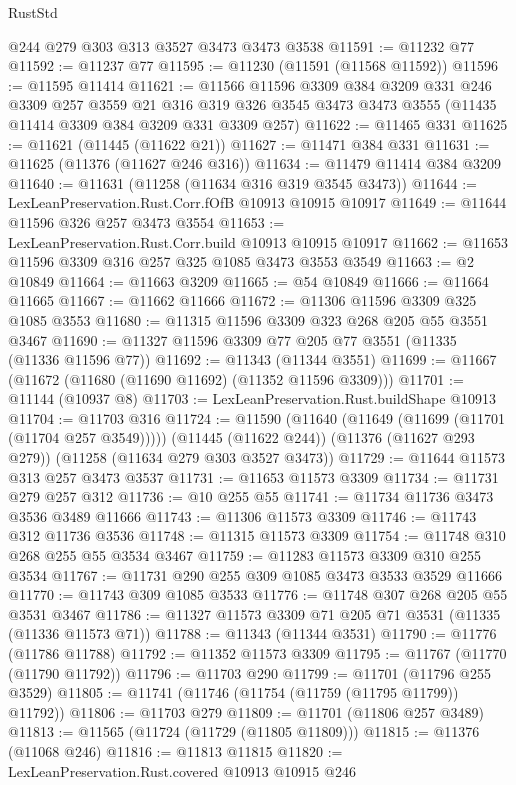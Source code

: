 \begin{lexlean}{RustStd}
\begin{coremodule}
{\begin{coremodule}
{{{{{{{{{{{{{{{{{{{{{{{{{{{{{{{{{{{{{{{{{{{{{{{{{{{{{{{{{{{{{{{{{{{{{{{{{{{{{{{{{{{{{    @244
    @279
    @303
    @313
    @3527
    @3473
    @3473
    @3538
@11591 := @11232 @77
@11592 := @11237 @77
@11595 := @11230 (@11591 (@11568 @11592))
@11596 := @11595 @11414
@11621 := @11566
    @11596
    @3309
    @384
    @3209
    @331
    @246
    @3309
    @257
    @3559
    @21
    @316
    @319
    @326
    @3545
    @3473
    @3473
    @3555
    (@11435 @11414 @3309 @384 @3209 @331 @3309 @257)
@11622 := @11465 @331
@11625 := @11621 (@11445 (@11622 @21))
@11627 := @11471 @384 @331
@11631 := @11625 (@11376 (@11627 @246 @316))
@11634 := @11479 @11414 @384 @3209
@11640 := @11631 (@11258 (@11634 @316 @319 @3545 @3473))
@11644 := LexLeanPreservation.Rust.Corr.fOfB @10913 @10915 @10917
@11649 := @11644 @11596 @326 @257 @3473 @3554
@11653 := LexLeanPreservation.Rust.Corr.build @10913 @10915 @10917
@11662 := @11653 @11596 @3309 @316 @257 @325 @1085 @3473 @3553 @3549
@11663 := @2 @10849
@11664 := @11663 @3209
@11665 := @54 @10849
@11666 := @11664 @11665
@11667 := @11662 @11666
@11672 := @11306 @11596 @3309 @325 @1085 @3553
@11680 := @11315 @11596 @3309 @323 @268 @205 @55 @3551 @3467
@11690 := @11327 @11596 @3309 @77 @205 @77 @3551 (@11335 (@11336 @11596 @77))
@11692 := @11343 (@11344 @3551)
@11699 := @11667 (@11672 (@11680 (@11690 @11692) (@11352 @11596 @3309)))
@11701 := @11144 (@10937 @8)
@11703 := LexLeanPreservation.Rust.buildShape @10913
@11704 := @11703 @316
@11724 := @11590
    (@11640 (@11649 (@11699 (@11701 (@11704 @257 @3549)))))
    (@11445 (@11622 @244))
    (@11376 (@11627 @293 @279))
    (@11258 (@11634 @279 @303 @3527 @3473))
@11729 := @11644 @11573 @313 @257 @3473 @3537
@11731 := @11653 @11573 @3309
@11734 := @11731 @279 @257 @312
@11736 := @10 @255 @55
@11741 := @11734 @11736 @3473 @3536 @3489 @11666
@11743 := @11306 @11573 @3309
@11746 := @11743 @312 @11736 @3536
@11748 := @11315 @11573 @3309
@11754 := @11748 @310 @268 @255 @55 @3534 @3467
@11759 := @11283 @11573 @3309 @310 @255 @3534
@11767 := @11731 @290 @255 @309 @1085 @3473 @3533 @3529 @11666
@11770 := @11743 @309 @1085 @3533
@11776 := @11748 @307 @268 @205 @55 @3531 @3467
@11786 := @11327 @11573 @3309 @71 @205 @71 @3531 (@11335 (@11336 @11573 @71))
@11788 := @11343 (@11344 @3531)
@11790 := @11776 (@11786 @11788)
@11792 := @11352 @11573 @3309
@11795 := @11767 (@11770 (@11790 @11792))
@11796 := @11703 @290
@11799 := @11701 (@11796 @255 @3529)
@11805 := @11741 (@11746 (@11754 (@11759 (@11795 @11799)) @11792))
@11806 := @11703 @279
@11809 := @11701 (@11806 @257 @3489)
@11813 := @11565 (@11724 (@11729 (@11805 @11809)))
@11815 := @11376 (@11068 @246)
@11816 := @11813 @11815
@11820 := LexLeanPreservation.Rust.covered @10913 @10915 @246
}}}}}}}}}}}}}}}}}}}}}}}}}}}}}}}}}}}}}}}}}}}}}}}}}}}}}}}}}}}}}}}}}}}}}}}}}}}}}}}}}}}}}
\end{coremodule}}
\end{coremodule}
\end{lexlean}
